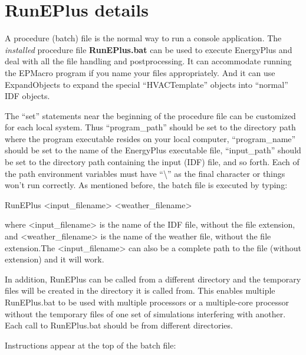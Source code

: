 \section{RunEPlus details}\label{runeplus-details}

A procedure (batch) file is the normal way to run a console application. The \emph{installed} procedure file \textbf{RunEPlus.bat} can be used to execute EnergyPlus and deal with all the file handling and postprocessing. It can accommodate running the EPMacro program if you name your files appropriately. And it can use ExpandObjects to expand the special ``HVACTemplate'' objects into ``normal'' IDF objects.

The ``set'' statements near the beginning of the procedure file can be customized for each local system. Thus ``program\_path'' should be set to the directory path where the program executable resides on your local computer, ``program\_name'' should be set to the name of the EnergyPlus executable file, ``input\_path'' should be set to the directory path containing the input (IDF) file, and so forth. Each of the path environment variables must have ``\textbackslash{}'' as the final character or things won't run correctly. As mentioned before, the batch file is executed by typing:

RunEPlus \textless{}input\_filename\textgreater{} \textless{}weather\_filename\textgreater{}

where \textless{}input\_filename\textgreater{} is the name of the IDF file, without the file extension, and \textless{}weather\_filename\textgreater{} is the name of the weather file, without the file extension.The \textless{}input\_filename\textgreater{} can also be a complete path to the file (without extension) and it will work.

In addition, RunEPlus can be called from a different directory and the temporary files will be created in the directory it is called from. This enables multiple RunEPlus.bat to be used with multiple processors or a multiple-core processor without the temporary files of one set of simulations interfering with another. Each call to RunEPlus.bat should be from different directories.

Instructions appear at the top of the batch file:

